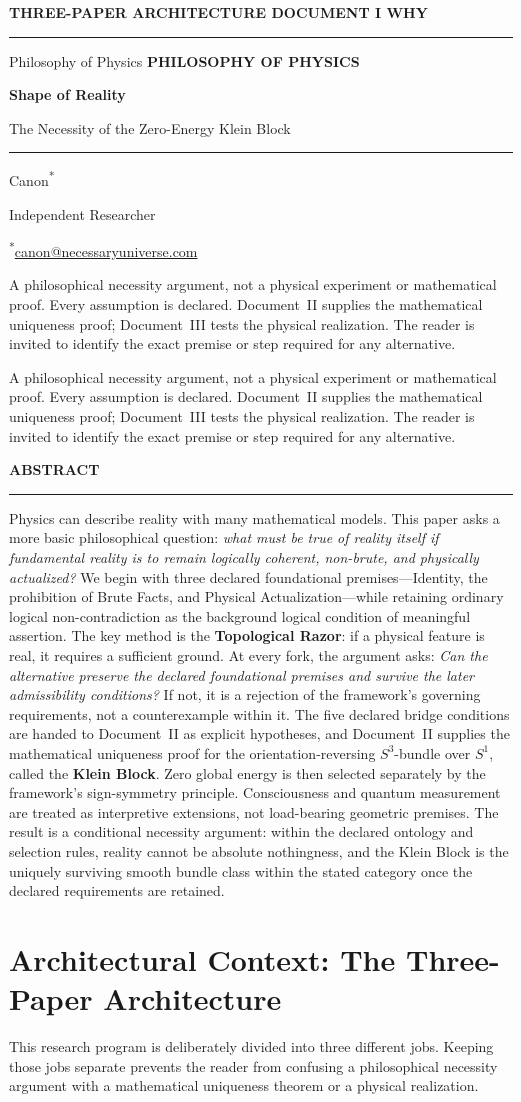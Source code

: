 \documentclass[11pt]{article}
\makeatletter
\theoremstyle{canonstyle}
\newcommand{\CanonTitlePage}{%
\begin{titlepage}
\thispagestyle{titlepage}
\vspace*{0.62cm}
{\sffamily\footnotesize\bfseries\color{seriesMuted}
THREE-PAPER ARCHITECTURE \hfill \CanonStage\par}
\vspace{0.42cm}
{\color{seriesAccent}\rule{\textwidth}{1.05pt}}\par
\vspace{1.65cm}
\ifx\CanonGenre\empty\else
{\sffamily\footnotesize\bfseries\color{seriesMuted}\MakeUppercase{\CanonGenre}}\par
\vspace{0.45cm}\fi
{\sffamily\bfseries\fontsize{28}{32}\selectfont\color{seriesInk}\hyphenpenalty=10000\exhyphenpenalty=10000\CanonTitle\par}
\vspace{0.52cm}
{\sffamily\large\color{seriesAccent}\CanonSubtitle\par}
\vspace{0.78cm}
{\color{seriesAccent}\rule{0.24\textwidth}{0.9pt}}\par
\vspace{0.95cm}
{\normalsize\sffamily Canon\textsuperscript{*}\;\orcidlink{0009-0001-9037-6209}\par}
\vspace{0.25cm}
{\small\sffamily\color{seriesMuted}Independent Researcher\par}
\vspace{0.16cm}
{\small\sffamily\color{seriesMuted}\textsuperscript{*}\href{mailto:canon@necessaryuniverse.com}{canon@necessaryuniverse.com}\par}
\vfill
\ifx\CanonDeck\empty\else
\begin{tcolorbox}[
  enhanced,
  colback=seriesPaper,
  colframe=seriesRule,
  boxrule=0.45pt,
  leftrule=2.4pt,
  arc=1.5pt,
  left=11pt,right=11pt,top=9pt,bottom=9pt,
  width=0.94\textwidth
]
\small\sffamily\color{seriesMuted}
\CanonDeck
\end{tcolorbox}
\vspace{0.65cm}
\fi

\end{titlepage}
}
\newenvironment{CanonAbstract}{%
  \begin{center}
  {\sffamily\footnotesize\bfseries\color{seriesMuted}\MakeUppercase{Abstract}}\\[-0.05em]
  {\color{seriesAccent}\rule{0.16\textwidth}{0.75pt}}
  \end{center}
  \begin{tcolorbox}[
    enhanced,
    breakable,
    colback=white,
    colframe=seriesRule,
    boxrule=0.4pt,
    leftrule=2.2pt,
    arc=1pt,
    left=12pt,right=12pt,top=9pt,bottom=9pt,
    before skip=5pt,after skip=4pt
  ]
  \small
}{%
  \end{tcolorbox}
}
\newcommand{\CanonStage}{DOCUMENT I \symbol{"00B7} WHY}
\newcommand{\CanonGenre}{Philosophy of Physics}
\newcommand{\CanonTitle}{Shape of Reality}
\newcommand{\CanonSubtitle}{The Necessity of the Zero-Energy Klein Block}
\newcommand{\CanonDeck}{A philosophical necessity argument, not a physical experiment or mathematical proof. Every assumption is declared. Document~II supplies the mathematical uniqueness proof; Document~III tests the physical realization. The reader is invited to identify the exact premise or step required for any alternative.}
\makeatother
\begin{document}
\CanonTitlePage

\setcounter{page}{1}

\begin{CanonAbstract}
Physics can describe reality with many mathematical models. This paper asks a more basic philosophical question: \emph{what must be true of reality itself if fundamental reality is to remain logically coherent, non-brute, and physically actualized?} We begin with three declared foundational premises---Identity, the prohibition of Brute Facts, and Physical Actualization---while retaining ordinary logical non-contradiction as the background logical condition of meaningful assertion. The key method is the \textbf{Topological Razor}: if a physical feature is real, it requires a sufficient ground. At every fork, the argument asks: \emph{Can the alternative preserve the declared foundational premises and survive the later admissibility conditions?} If not, it is a rejection of the framework's governing requirements, not a counterexample within it. The five declared bridge conditions are handed to Document~II as explicit hypotheses, and Document~II supplies the mathematical uniqueness proof for the orientation-reversing $S^3$-bundle over $S^1$, called the \textbf{Klein Block}. Zero global energy is then selected separately by the framework's sign-symmetry principle. Consciousness and quantum measurement are treated as interpretive extensions, not load-bearing geometric premises. The result is a conditional necessity argument: within the declared ontology and selection rules, reality cannot be absolute nothingness, and the Klein Block is the uniquely surviving smooth bundle class within the stated category once the declared requirements are retained.
\end{CanonAbstract}

\section*{Architectural Context: The Three-Paper Architecture}
{}

This research program is deliberately divided into three different jobs. Keeping those jobs separate prevents the reader from confusing a philosophical necessity argument with a mathematical uniqueness theorem or a physical realization.
\end{document}
